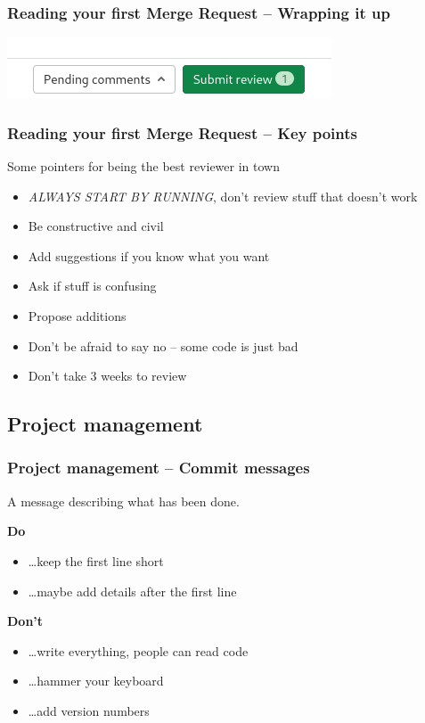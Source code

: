 \documentclass{beamer}
\newcommand{\keyword}[1]{\hspace{-1.0em}\textcolor{lkblue}{\textbf{#1}}\vspace{0.2em}} %
\begin{document}
\begin{frame}[fragile]
  \frametitle{Reading your first Merge Request -- Wrapping it up}
  \includegraphics[width=\linewidth]{gitlab-first-review/10-submit.png}
\end{frame}

\begin{frame}[fragile]
  \frametitle{Reading your first Merge Request -- Key points}

  Some pointers for being the best reviewer in town
  \begin{itemize}[<+->]
    \item \emph{ALWAYS START BY RUNNING}, don't review stuff that doesn't work
    \item Be constructive and civil
    \item Add suggestions if you know what you want
    \item Ask if stuff is confusing
    \item Propose additions
    \item Don't be afraid to say no -- some code is just bad
    \item Don't take 3 weeks to review
  \end{itemize}
\end{frame}

\subsection{Project management}

\begin{frame}[fragile]
  \frametitle{Project management -- Commit messages}
  \vspace{1em}

  A message describing what has been done.
  \vspace{1em}

  \keyword{Do}
  \begin{itemize}
    \item \dots keep the first line short
    \item \dots maybe add details after the first line
  \end{itemize}
  \vspace{1em}

  \pause

  \keyword{Don't}
  \begin{itemize}
    \item \dots write everything, people can read code
    \item \dots hammer your keyboard
    \item \dots add version numbers
  \end{itemize}
  \vspace{1em}

\end{frame}
\end{document}
